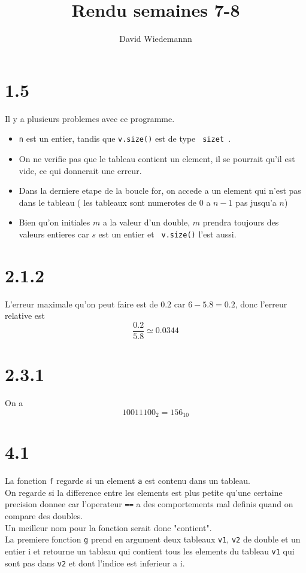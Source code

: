 \documentclass[11pt, a4paper, twoside]{article}
\begin{document}
\title{Rendu semaines 7-8}
\author{David Wiedemannn}
\maketitle
\section*{1.5}
Il y a plusieurs problemes avec ce programme.
\begin{itemize}
	\item \texttt{n} est un entier, tandis que \texttt{v.size()} est de type \texttt{ size\textunderscore t }.
	\item On ne verifie pas que le tableau contient un element, il se pourrait qu'il est vide, ce qui donnerait une erreur.
	\item Dans la derniere etape de la boucle for, on accede a un element qui n'est pas dans le tableau ( les tableaux sont numerotes de 0 a $n-1$ pas jusqu'a $n$) 
\item Bien qu'on initiales $m$ a la valeur d'un double, $m$ prendra toujours des valeurs entieres car $s$ est un entier et \texttt{ v.size()} l'est aussi.
\end{itemize}
\section*{2.1.2}
L'erreur maximale qu'on peut faire est de $0.2$ car $6-5.8=0.2$, donc l'erreur relative est
\[ 
\frac{0.2}{5.8} \simeq 0.0344
\]
\section*{2.3.1}
On a 
\[ 
10011100_2= 156_{10} 
\]
\section*{4.1}
La fonction \texttt{f} regarde si un element \texttt{a} est contenu dans un tableau.\\
On regarde si la difference entre les elements est plus petite qu'une certaine precision donnee car l'operateur \texttt{==} a des comportements mal definis quand on compare des doubles.\\
Un meilleur nom pour la fonction serait donc "contient".\\

La premiere fonction \texttt{g} prend en argument deux tableaux \texttt{v1}, \texttt{v2}  de double et un entier i et retourne un tableau qui contient tous les elements du tableau \texttt{v1}  qui sont pas dans \texttt{v2} et dont l'indice est inferieur a i.
\end{document}
